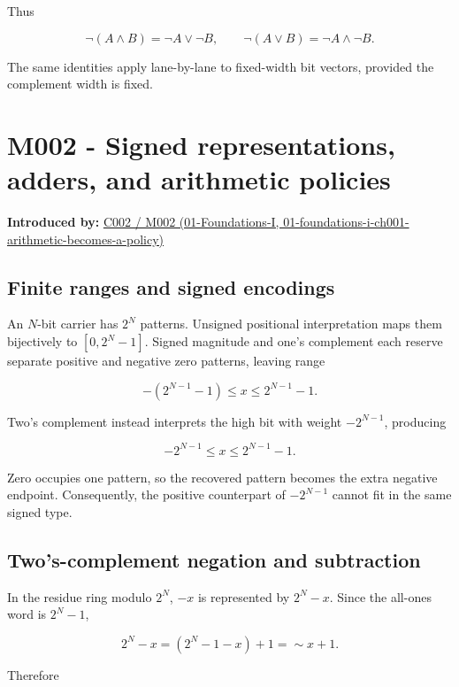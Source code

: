 Thus

\[
\neg(A\land B)=\neg A\lor\neg B,
\qquad
\neg(A\lor B)=\neg A\land\neg B.
\]

The same identities apply lane-by-lane to fixed-width bit vectors, provided the complement width is fixed.

\section{M002 - Signed representations, adders, and arithmetic policies}\label{03-visual-computing-i-ch018-m002---signed-representations-adders-and-arithmetic-policies}

\textbf{Introduced by:} \href{../01-Foundations-I/main.pdf\#nameddest=01-foundations-i-ch001-arithmetic-becomes-a-policy}{C002 / M002 (01-Foundations-I, 01-foundations-i-ch001-arithmetic-becomes-a-policy)}

\subsection{Finite ranges and signed encodings}\label{03-visual-computing-i-ch018-finite-ranges-and-signed-encodings}

An \(N\)-bit carrier has \(2^N\) patterns. Unsigned positional interpretation maps them bijectively to \([0,2^N-1]\). Signed magnitude and one's complement each reserve separate positive and negative zero patterns, leaving range

\[
-(2^{N-1}-1)\le x\le2^{N-1}-1.
\]

Two's complement instead interprets the high bit with weight \(-2^{N-1}\), producing

\[
-2^{N-1}\le x\le2^{N-1}-1.
\]

Zero occupies one pattern, so the recovered pattern becomes the extra negative endpoint. Consequently, the positive counterpart of \(-2^{N-1}\) cannot fit in the same signed type.

\subsection{Two's-complement negation and subtraction}\label{03-visual-computing-i-ch018-twos-complement-negation-and-subtraction}

In the residue ring modulo \(2^N\), \(-x\) is represented by \(2^N-x\). Since the all-ones word is \(2^N-1\),

\[
2^N-x=(2^N-1-x)+1=\sim x+1.
\]

Therefore

